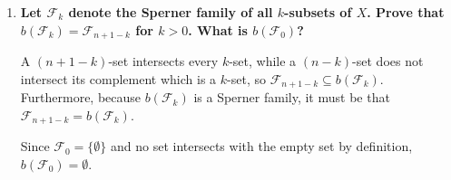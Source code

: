 \documentclass[a4paper,12pt]{article}
\begin{document}
\begin{enumerate}
\begin{enumerate}
            \item
                \boldmath
                \textbf{Let $\mathcal{F}_k$ denote the Sperner family of all $k$-subsets of $X$. Prove that $b(\mathcal{F}_k) = \mathcal{F}_{n + 1 - k }$ for $k > 0$. What is $b(\mathcal{F}_0)$?} \par
                \unboldmath
                A $(n + 1 - k)$-set intersects every $k$-set, while a $(n - k)$-set does not intersect its complement which is a $k$-set, so $\mathcal{F}_{n + 1 - k} \subseteq b(\mathcal{F}_k)$. Furthermore, because $b(\mathcal{F}_k)$ is a Sperner family, it must be that $\mathcal{F}_{n + 1 - k} = b(\mathcal{F}_k)$. \par
                Since $\mathcal{F}_0 = \{ \emptyset \}$ and no set intersects with the empty set by definition, $b(\mathcal{F}_0) = \emptyset$.
        \end{enumerate}
\end{enumerate}
\end{document}
